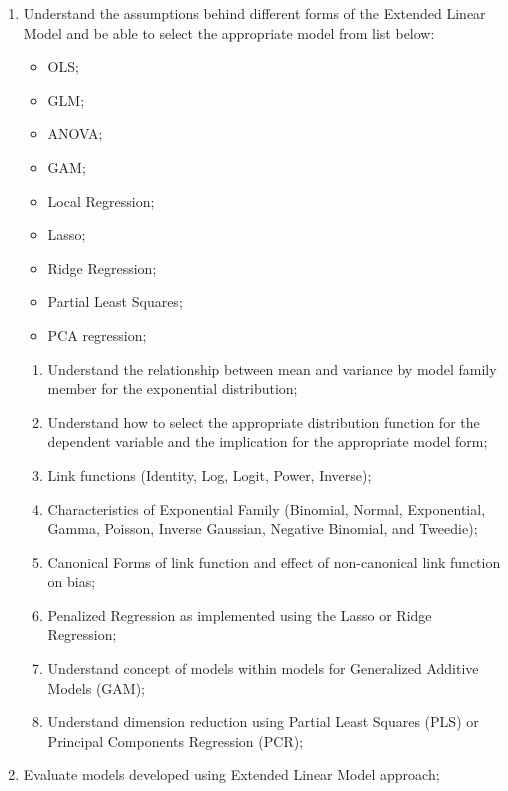 \begin{outcomes}
\begin{enumerate}
	\item	Understand the assumptions behind different forms of the Extended Linear Model and be able to select the appropriate model from list below:
	\begin{multicols*}{2}
		\begin{itemize}
		\item	OLS;
		\item	GLM;
		\item	ANOVA;
		\item	GAM;
		\item	Local Regression;
		\item	Lasso;
		\item	Ridge Regression;
		\item	Partial Least Squares;
		\item	PCA regression;
		\end{itemize}
	\end{multicols*}
	\begin{knowledge}
	\begin{enumerate}[label = \alph*.]
		\item	Understand the relationship between mean and variance by model family member for the exponential distribution;
		\item	Understand how to select the appropriate distribution function for the dependent variable and the implication for the appropriate model form;
		\item	Link functions (Identity, Log, Logit, Power, Inverse);
		\item	Characteristics of Exponential Family (Binomial, Normal, Exponential, Gamma, Poisson, Inverse Gaussian, Negative Binomial, and Tweedie);
		\item	Canonical Forms of link function and effect of non-canonical link function on bias;
		\item	Penalized Regression as implemented using the Lasso or Ridge Regression;
		\item	Understand concept of models within models for Generalized Additive Models (GAM);
		\item	Understand dimension reduction using Partial Least Squares (PLS) or Principal Components Regression (PCR);
	\end{enumerate}
	\end{knowledge}
\tcbline
	\item	Evaluate models developed using Extended Linear Model approach;

\end{enumerate}
\end{outcomes}
